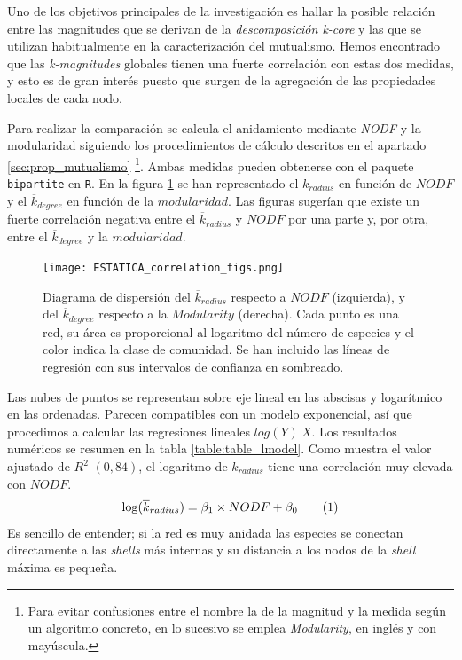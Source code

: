 Uno de los objetivos principales de la investigación es hallar la posible relación entre las magnitudes que se derivan de la \textit{descomposición k-core} y las que se utilizan habitualmente en la caracterización del mutualismo. Hemos encontrado que las \textit{k-magnitudes} globales tienen una fuerte correlación con estas dos medidas, y esto es de gran interés puesto que surgen de la agregación de las propiedades locales de cada nodo.

Para realizar la comparación se calcula el anidamiento mediante \textit{NODF} y la modularidad siguiendo los procedimientos de cálculo descritos en el apartado \ref{sec:prop_mutualismo} \footnote{Para evitar confusiones entre el nombre la de la magnitud y la medida según un algoritmo concreto, en lo sucesivo se emplea \textit{Modularity}, en inglés y con mayúscula.}. Ambas medidas pueden obtenerse con el paquete \texttt{bipartite} en \texttt{R}. En la figura \ref{fig:ESTATICA_corrfigs} se han representado el $\overline {k}_{radius}$ en función de $NODF$ y el $\overline {k}_{degree}$ en función de la $modularidad$. Las figuras sugerían que existe un fuerte correlación negativa entre el $\overline {k}_{radius}$ y $NODF$ por una parte y, por otra, entre el $\overline {k}_{degree}$ y la $modularidad$. 

\begin{figure}[h!]
\centering
\texttt{[image: ESTATICA\_correlation\_figs.png]}
\caption {Diagrama de dispersión del $\overline {k}_{radius}$ respecto a $NODF$ (izquierda), y del $\overline {k}_{degree}$ respecto a la $Modularity$ (derecha). Cada punto es una red, su área es proporcional al logaritmo del número de especies y el color indica la clase de comunidad. Se han incluido las líneas de regresión con sus intervalos de confianza en sombreado.}
\label{fig:ESTATICA_corrfigs}
\end{figure}

Las nubes de puntos se representan sobre eje lineal en las abscisas y logarítmico en las ordenadas. Parecen compatibles con un modelo exponencial, así que procedimos a calcular las regresiones lineales $log(Y) ~ X$. Los resultados numéricos se resumen en la tabla \ref{table:table_lmodel}. Como muestra el valor ajustado de $R^2$ $(0,84)$, el logaritmo de $\overline {k}_{radius}$ tiene una correlación muy elevada con $NODF$. 
\begin{align}
\displaystyle \log({\overline k_{radius}}) = \beta_1 \times NODF + \beta_0
\stepcounter{equation}\tag{\theequation}\label{eq:kradius_vs_nodf}
\end{align}
Es sencillo de entender; si la red es muy anidada las especies se conectan directamente a las \textit{shells} más internas y su distancia a los nodos de la \textit{shell} máxima es pequeña. 


